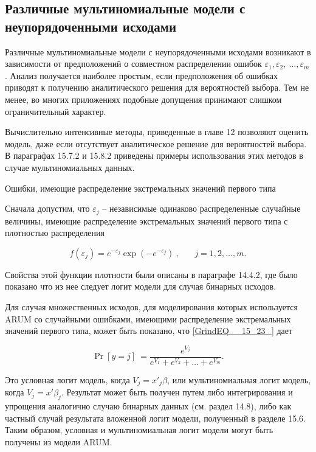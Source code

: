 \subsection{Различные  мультиномиальные модели с неупорядоченными исходами}

Различные мультиномиальные модели с неупорядоченными исходами возникают в зависимости от предположений о совместном распределении ошибок ${\varepsilon }_1,{\varepsilon }_2,\ \dots ,{\varepsilon }_m$. Анализ получается наиболее простым, если предположения об ошибках приводят к получению аналитического решения для вероятностей выбора. Тем не менее, во многих приложениях подобные допущения принимают слишком ограничительный характер.

Вычислительно интенсивные методы, приведенные в главе 12 позволяют оценить модель, даже если отсутствует аналитическое решение для вероятностей выбора. В параграфах 15.7.2 и 15.8.2 приведены примеры использования этих методов в случае мультиномиальных данных.

Ошибки, имеющие распределение экстремальных значений первого типа

Сначала допустим, что ${\varepsilon }_j$ -- независимые одинаково распределенные случайные величины, имеющие распределение экстремальных значений первого типа с плотностью распределения

\begin{equation} \label{GrindEQ__15_25_} f\left({\varepsilon }_j\right)=e^{-{\varepsilon }_j}{\exp  \left(-e^{-{\varepsilon }_j}\right)\ },\ \ \ \ \ \ \ \ j=1,2,\dots ,m. \end{equation} 

Свойства этой функции плотности были описаны в параграфе 14.4.2, где было показано что из нее следует логит модели для случая бинарных исходов.

Для случая множественных исходов, для моделирования которых используется ARUM со случайными ошибками, имеющими распределение экстремальных значений первого типа, может быть показано, что \eqref{GrindEQ__15_23_} дает

\begin{equation} \label{GrindEQ__15_26_} {\Pr  \left[y=j\right]\ }=\frac{e^{V_j}}{e^{V_1}+e^{V_2}+\dots +e^{V_m}}. \end{equation} 

Это условная логит модель, когда $V_j=x'_j\beta $, или мультиномиальная логит модель, когда $V_j=x'{\beta }_j.$ Результат может быть получен путем либо интегрирования и упрощения аналогично случаю бинарных данных (см. раздел 14.8), либо как частный случай результата вложенной логит модели, полученный в разделе 15.6. Таким образом, условная и мультиномиальная логит модели могут быть получены из модели ARUM.


